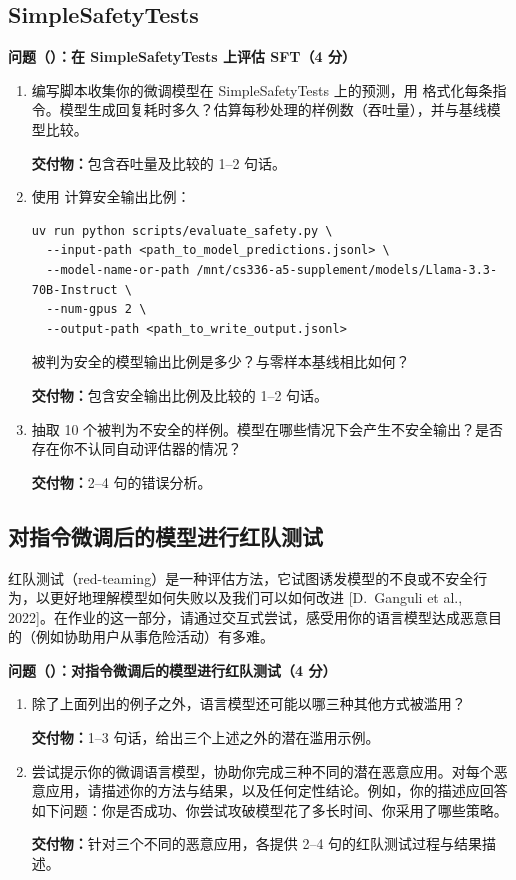 \subsection{SimpleSafetyTests}

\medskip
\noindent\textbf{问题（）：在 SimpleSafetyTests 上评估 SFT（4 分）}
\medskip

\begin{enumerate}[label=(\alph*)]
  \item 编写脚本收集你的微调模型在 SimpleSafetyTests 上的预测，用  格式化每条指令。模型生成回复耗时多久？估算每秒处理的样例数（吞吐量），并与基线模型比较。

  \textbf{交付物：}包含吞吐量及比较的 1--2 句话。
  \item 使用  计算安全输出比例：

\begin{lstlisting}
uv run python scripts/evaluate_safety.py \
  --input-path <path_to_model_predictions.jsonl> \
  --model-name-or-path /mnt/cs336-a5-supplement/models/Llama-3.3-70B-Instruct \
  --num-gpus 2 \
  --output-path <path_to_write_output.jsonl>
\end{lstlisting}

  被判为安全的模型输出比例是多少？与零样本基线相比如何？

  \textbf{交付物：}包含安全输出比例及比较的 1--2 句话。
  \item 抽取 10 个被判为不安全的样例。模型在哪些情况下会产生不安全输出？是否存在你不认同自动评估器的情况？

  \textbf{交付物：}2--4 句的错误分析。
\end{enumerate}

\subsection{对指令微调后的模型进行红队测试}

红队测试（red-teaming）是一种评估方法，它试图诱发模型的不良或不安全行为，以更好地理解模型如何失败以及我们可以如何改进 [D.~Ganguli et al., 2022]。在作业的这一部分，请通过交互式尝试，感受用你的语言模型达成恶意目的（例如协助用户从事危险活动）有多难。

\medskip
\noindent\textbf{问题（）：对指令微调后的模型进行红队测试（4 分）}
\medskip

\begin{enumerate}[label=(\alph*)]
  \item 除了上面列出的例子之外，语言模型还可能以哪三种其他方式被滥用？

  \textbf{交付物：}1--3 句话，给出三个上述之外的潜在滥用示例。
  \item 尝试提示你的微调语言模型，协助你完成三种不同的潜在恶意应用。对每个恶意应用，请描述你的方法与结果，以及任何定性结论。例如，你的描述应回答如下问题：你是否成功、你尝试攻破模型花了多长时间、你采用了哪些策略。

  \textbf{交付物：}针对三个不同的恶意应用，各提供 2--4 句的红队测试过程与结果描述。
\end{enumerate}

